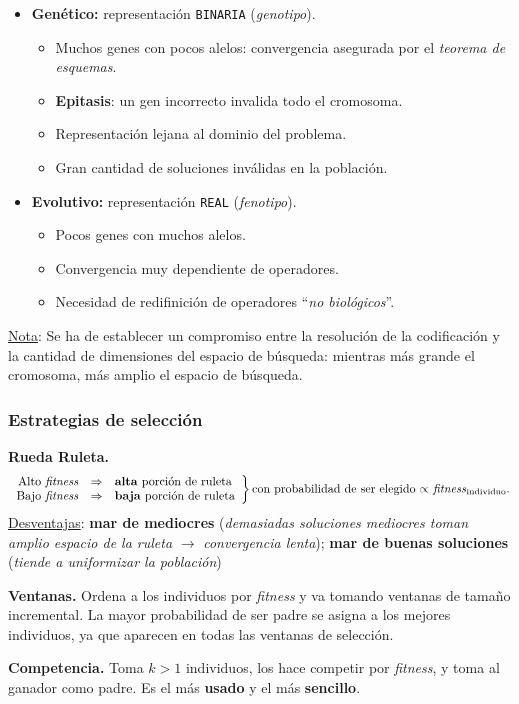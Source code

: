 \documentclass[10pt,a4paper]{article}
\begin{document}
\begin{itemize}
\item \textbf{Genético:} representación \texttt{BINARIA} (\textit{genotipo}).
\begin{itemize}
\item Muchos genes con pocos alelos: convergencia asegurada por el \textit{teorema de esquemas}.
\item \textbf{Epitasis}: un gen incorrecto invalida todo el cromosoma.
\item Representación lejana al dominio del problema.
\item Gran cantidad de soluciones inválidas en la población.
\end{itemize}
\item \textbf{Evolutivo:} representación \texttt{REAL} (\textit{fenotipo}).
\begin{itemize}
\item Pocos genes con muchos alelos.
\item Convergencia muy dependiente de operadores.
\item Necesidad de redifinición de operadores ``\textit{no biológicos}''.
\end{itemize}
\end{itemize}

\underline{Nota}: Se ha de establecer un compromiso entre la resolución de la codificación y la cantidad de dimensiones del espacio de búsqueda: mientras más grande el cromosoma, más amplio el espacio de búsqueda.

\subsubsection{Estrategias de selección}

\begin{description}
\item \textbf{Rueda Ruleta.} 
\[
\left.
\begin{array}{rcl}
\text{Alto \textit{fitness}} & \Rightarrow & \text{\textbf{alta} porción de ruleta} \\
\text{Bajo \textit{fitness}} & \Rightarrow & \text{\textbf{baja} porción de ruleta}
\end{array}
\right\}
\text{con probabilidad de ser elegido $\propto$ \textit{fitness}$_{\text{individuo}}$.}
\]
\underline{Desventajas}: \textbf{mar de mediocres} (\textit{demasiadas soluciones mediocres toman amplio espacio de la ruleta} $\rightarrow$ \textit{convergencia lenta}); \textbf{mar de buenas soluciones} (\textit{tiende a uniformizar la población})
\item \textbf{Ventanas.} Ordena a los individuos por \textit{fitness} y va tomando ventanas de tamaño incremental. La mayor probabilidad de ser padre se asigna a los mejores individuos, ya que aparecen en todas las ventanas de selección.
\item \textbf{Competencia.} Toma $k>1$ individuos, los hace competir por \textit{fitness}, y toma al ganador como padre. Es el más \textbf{usado} y el más \textbf{sencillo}.
\end{description}
\end{document}
